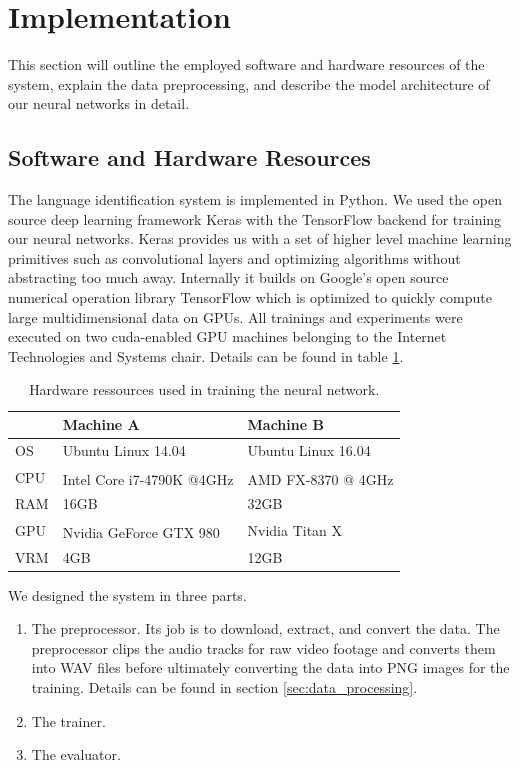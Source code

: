 \section{Implementation}
This section will outline the employed software and hardware resources of the system, explain the data preprocessing, and describe the model architecture of our neural networks in detail.

\subsection{Software and Hardware Resources}

	The language identification system is implemented in Python. We used the open source deep learning framework Keras\cite{chollet2015keras} with the TensorFlow\cite{abadi2016tensorflow} backend for training our neural networks. Keras provides us with a set of higher level machine learning primitives such as convolutional layers and optimizing algorithms without abstracting too much away. Internally it builds on Google's open source numerical operation library TensorFlow which is optimized to quickly compute large multidimensional data on GPUs.
		All trainings and experiments were executed on two cuda-enabled GPU machines belonging to the Internet Technologies and Systems chair. Details can be found in table \ref{tab:hardware}.
		
	\begin{table}[h]
	\centering
	\begin{tabularx}{\textwidth}{lll}
	\toprule
	  		& Machine A 					& Machine B \\ \midrule
	OS  	& Ubuntu Linux 14.04 		& Ubuntu Linux 16.04 \\
	CPU  	& Intel\textsuperscript{\textregistered} Core\textsuperscript{\texttrademark} i7-4790K @4GHz 	& AMD FX\textsuperscript{\texttrademark}-8370  @ 4GHz \\
	RAM  	& 16GB 						& 32GB \\
	GPU  	& Nvidia GeForce\textsuperscript{\textregistered} GTX 980 	& Nvidia Titan X \\
	VRM  	& 4GB 						& 12GB \\
	\bottomrule
	\end{tabularx}
	\caption{Hardware ressources used in training the neural network.}
	\label{tab:hardware}
	\end{table}
	 
	We designed the system in three parts. 
	\begin{enumerate}
		\item The preprocessor. Its job is to download, extract, and convert the data. The preprocessor clips the audio tracks for raw video footage and converts them into WAV files before ultimately converting the data into PNG images for the training. Details can be found in section \ref{sec:data_processing}.
		\item The trainer. 
		\item The evaluator.
	\end{enumerate}

